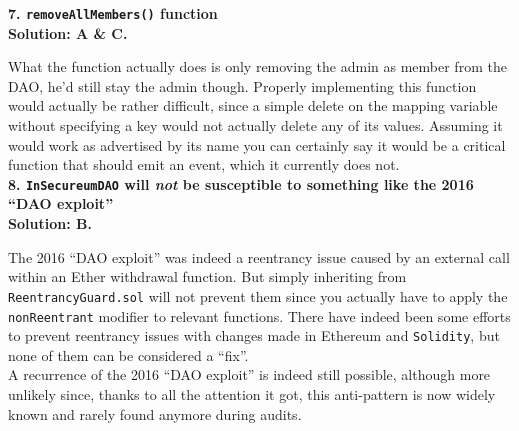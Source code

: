 \textbf{7. \texttt{removeAllMembers()} function}\label{sec:exam7_q7}\\

\textbf{Solution: A \& C.}

What the function actually does is only removing the admin as member from the DAO, he'd still stay the admin though.
Properly implementing this function would actually be rather difficult, since a simple delete on the mapping variable without specifying a key would not actually delete any of its values.
Assuming it would work as advertised by its name you can certainly say it would be a critical function that should emit an event, which it currently does not.\\

\textbf{8. \texttt{InSecureumDAO} will \textit{not} be susceptible to something like the 2016 ``DAO exploit''}\label{sec:exam7_q8}\\

\textbf{Solution: B.}

The 2016 ``DAO exploit'' was indeed a reentrancy issue caused by an external call within an Ether withdrawal function.
But simply inheriting from \verb|ReentrancyGuard.sol| will not prevent them since you actually have to apply the \verb|nonReentrant| modifier to relevant functions.
There have indeed been some efforts to prevent reentrancy issues with changes made in Ethereum and \verb|Solidity|, but none of them can be considered a ``fix''.\\

A recurrence of the 2016 ``DAO exploit'' is indeed still possible, although more unlikely since, thanks to all the attention it got, this anti-pattern is now widely known and rarely found anymore during audits.\\